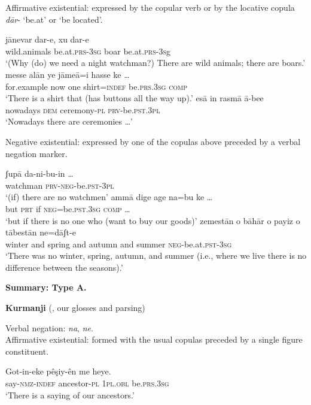 ﻿\documentclass[output=paper]{langsci/langscibook}
\begin{document}
\begin{unindented}
Affirmative existential: expressed by the copular verb or by the locative copula \textit{dār}- `be.at' or `be located'.

\begin{exe}\ex \gll jānevar dar-e, xu    dar-e \\
wild.animals  be.at.\textsc{prs-3sg}   boar be.at.\textsc{prs-3s}g \\
    \glt `(Why (do) we need a night watchman?) There are wild animals; there are boars.' \parencite[84]{ShokriJahani2013}
\ex \gll messe alān  ye   jāmeā=i hasse ke … \\
for.example now  one shirt=\textsc{indef} be.\textsc{prs}.\textsc{3sg}    \textsc{comp} \\
    \glt `There is a shirt that (has buttons all the way up).'
\parencite[153]{ShokriJahani2013}
\ex \gll esā in rasmā ā-bee \\
nowadays \textsc{dem} ceremony-\textsc{pl} \textsc{prv}-be.\textsc{pst.3pl} \\
    \glt `Nowadays there are ceremonies …' \parencite[80]{ShokriJahani2013}
    \end{exe}

Negative existential: expressed by one of the copulas above preceded by a verbal negation marker.

\begin{exe}\ex \gll ʃupā da-ni-bu-in … \\
watchman \textsc{prv}-\textsc{neg}-be.\textsc{pst}-\textsc{3pl} \\
    \glt `(if) there are no watchmen' \parencite[84]{ShokriJahani2013}
\ex \gll ammā dige  age  na=bu ke … \\
but \textsc{prt} if \textsc{neg}=be.\textsc{pst}.\textsc{3sg} \textsc{comp}  … \\
    \glt `but if there is no one who (want to buy our goods)'
\parencite[82]{ShokriJahani2013}
\ex \gll zemestān o bāhār  o payiz o tābestān ne=dāʃt-e \\
winter and spring and autumn and summer \textsc{neg}-be.at.\textsc{pst-3sg}\\
    \glt `There was no winter, spring, autumn, and summer (i.e., where we live there is no difference between the seasons).' \parencite[65]{ShokriJahani2013}
    \end{exe} 

\textbf{Summary: Type A.}

\textbf{Kurmanji} (\citealt{Thackston2006}, our glosses and parsing)

Verbal negation: \textit{na}, \textit{ne}.\\
Affirmative existential: formed with the usual copulas preceded by a single figure constituent.
%
\begin{exe}\ex \gll Got-in-eke pêşiy-ên me heye.  \\
say-\textsc{nmz}-\textsc{indef}   ancestor-\textsc{pl} \textsc{1pl}.\textsc{obl}   be.\textsc{prs.3sg} \\
    \glt `There is a saying of our ancestors.' \parencite[31]{Thackston2006}
    \end{exe} 


\end{unindented}
\end{document}
